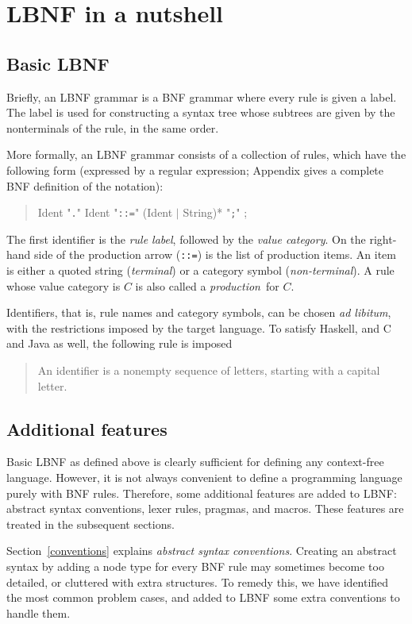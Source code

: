 \documentclass[10pt]{article}
\newcommand{\bequ}{\begin{quote}}
\newcommand{\enqu}{\end{quote}}
\begin{document}
\section{LBNF in a nutshell}

\subsection{Basic LBNF}

Briefly, an LBNF grammar is a BNF grammar where every rule is given a label.
The label is used for constructing a syntax tree whose subtrees are
given by the nonterminals of the rule, in the same order.

More formally, an LBNF grammar consists of a collection of rules, 
which have the following form (expressed by a regular expression;
Appendix gives a complete BNF definition of the notation):
\bequ
  Ident "{\tt .}" Ident "{\tt ::=}" (Ident $\mid$ String)* "{\tt;}" ;
\enqu
The first identifier is the \textit{rule label}, followed by the
\textit{value category}. On the right-hand side of the production
arrow ({\tt ::=}) is the list of production items. An item is either
a quoted string (\textit{terminal}) or a category symbol (\textit{non-terminal}).
A rule whose value category is $C$ is also called a \textit{production}\ for $C$.

Identifiers, that is, rule names and category symbols, can be 
chosen {\em ad libitum}, with the restrictions imposed by the target language. To
satisfy Haskell, and C and Java as well, the following rule is imposed
\bequ
An identifier is a nonempty sequence of letters, starting with a 
capital letter. 
\enqu


\subsection{Additional features}

Basic LBNF as defined above 
is clearly sufficient for defining any context-free language. However, 
it is not always convenient to define a programming language purely with BNF rules.
Therefore, some additional features are added to LBNF: abstract syntax conventions,
lexer rules, pragmas, and macros. These features are treated in the
subsequent sections.

Section~\ref{conventions} explains {\em abstract syntax conventions}.
Creating an abstract syntax by adding a node type for every BNF rule
may sometimes become too detailed, 
or cluttered with extra structures. 
To remedy this, we have identified the most common problem cases, 
and added to LBNF
some extra conventions to handle them.
\end{document}
